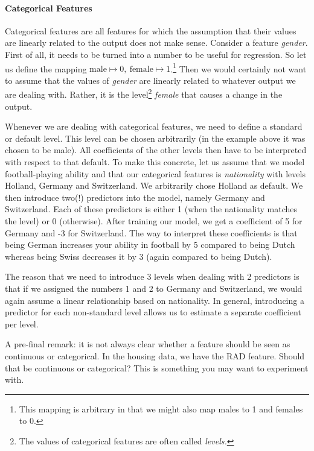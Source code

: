 \documentclass[11pt, leqno, a4paper]{article}
\begin{document}
\paragraph{Categorical Features} Categorical features are all features for which the assumption
that their values are linearly related to the output does not make sense. Consider a feature \textit{gender}.
First of all, it needs to be turned into a number to be useful for regression. So let us
define the mapping $ \text{male} \mapsto 0, \ \text{female} \mapsto 1 $.\footnote{This mapping
is arbitrary in that we might also map males to 1 and females to 0.} Then we would certainly not
want to assume that the values of \textit{gender} are linearly related to whatever output we are dealing
with. Rather, it is the level\footnote{The values of categorical features are often called \textit{levels.}}
\textit{female} that causes a change in the output.

Whenever we are dealing with categorical features, we need to define a standard or default level. This
level can be chosen arbitrarily (in the example above it was chosen to be male). 
All coefficients of the other levels then have to be interpreted with
respect to that default. To make this concrete, let us assume that we model football-playing ability and
that our categorical features is \textit{nationality} with levels Holland, Germany and Switzerland.
We arbitrarily chose Holland as default. We then introduce two(!) predictors into the model, namely
Germany and Switzerland. Each of these predictors is either 1 (when the nationality matches the level)
or 0 (otherwise). After training our model, we get a coefficient of 5 for Germany and -3 for Switzerland.
The way to interpret these coefficients is that being German increases your ability in football by 5
compared to being Dutch whereas being Swiss decreases it by 3 (again compared to being Dutch).

The reason that we need to introduce 3 levels when dealing with 2 predictors is that if we assigned
the numbers 1 and 2 to Germany and Switzerland, we would again assume a linear relationship based on
nationality. In general, introducing a predictor for each non-standard level allows us to estimate a separate coefficient
per level.

A pre-final remark: it is not always clear whether a feature should be seen as continuous or categorical.
In the housing data, we have the RAD feature. Should that be continuous or categorical? This is
something you may want to experiment with.
\end{document}
